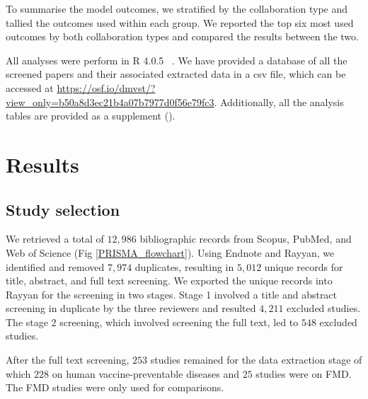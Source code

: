 \documentclass[10pt,letterpaper]{article}
\begin{document}
To summarise the model outcomes, we stratified by the collaboration type and tallied the outcomes used within each group. We reported the top six most used outcomes by both collaboration types and compared the results between the two.

All analyses were perform in R 4.0.5 ~\cite{R2021}. We have provided a database of all the screened papers and their associated extracted data in a csv file, which can be accessed at \url{https://osf.io/dmvst/?view_only=b50a8d3ec21b4a07b7977d0f56e79fc3}. Additionally, all the analysis tables are provided as a supplement (). 

\section*{Results}
\subsection*{Study selection}
We retrieved a total of $12, 986$ bibliographic records from Scopus, PubMed, and Web of Science (Fig \ref{PRISMA_flowchart}). Using Endnote and Rayyan, we identified and removed $7, 974$ duplicates, resulting in $5, 012$ unique records for title, abstract, and full text screening. We exported the unique records into Rayyan for the screening in two stages. Stage 1 involved a title and abstract screening in duplicate by the three reviewers and resulted $4, 211$ excluded studies. The stage 2 screening, which involved screening the full text, led to $548$ excluded studies. 

After the full text screening, $253$ studies remained for the data extraction stage of which $228$ on human vaccine-preventable diseases and $25$ studies were on FMD. The FMD studies were only used for comparisons. 
\end{document}
